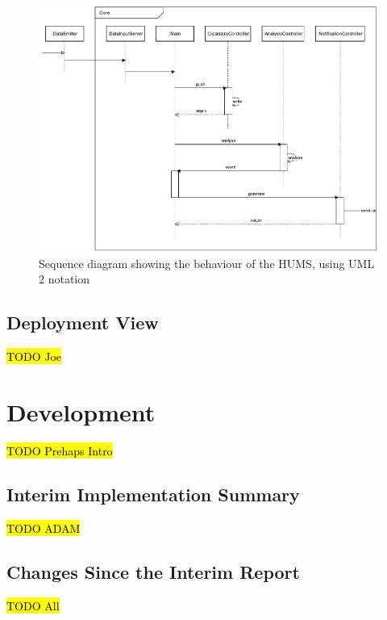 \documentclass[10pt,a4paper]{article}
\begin{document}
\begin{figure}
  \centering
  \includegraphics[width=\textwidth]{images/behaviourView.pdf}
  \caption{Sequence diagram showing the behaviour of the HUMS, using UML 2 notation}
  \label{fig:sequence}
\end{figure}


\subsection{Deployment View}
\hl{TODO Joe}
\section{Development}
\label{sec:dev}
\hl{TODO Prehaps Intro}

\subsection{Interim Implementation Summary}
\label{sec:interim_summary}
\hl{TODO ADAM}

\subsection{Changes Since the Interim Report}
\label{sec:changes}
\hl{TODO All}
\end{document}
